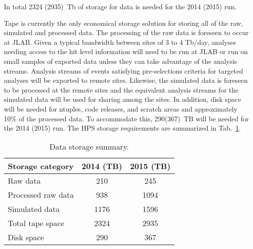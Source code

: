In total 2324 (2935)~Tb of storage for data is needed for the 2014 (2015) run.

Tape is currently the only economical storage
solution for storing all of the raw, simulated and processed data.
The processing of the raw data is foreseen to occur at JLAB. Given a
typical bandwidth between sites of 3 to 4 Tb/day, analyses needing
access to the hit level information will need to be run at JLAB or run
on small samples of exported data unless they can take advantage of the
analysis streams. Analysis streams of events satisfying
pre-selections criteria for targeted analyses will be exported to remote
sites. Likewise, the simulated data is foreseen to be processed at the
remote sites and the equivalent analysis streams for the simulated data
will be used for sharing among the sites. In addition, disk space will be 
needed for ntuples, code releases, and scratch areas and approximately 10\% of the 
processed data. To accommodate this, 290(367)~TB will be needed for the 2014 (2015) run. 
The HPS storage requirements are summarized in Tab.~\ref{tab:datastorage}.
\begin{table}[tbp]
\centering
\begin{tabular}{|l|c|c|}
\hline
Storage category & 2014 (TB) & 2015 (TB) \\
\hline
Raw data & 210 & 245 \\
Processed raw data & 938 & 1094 \\
Simulated data & 1176 & 1596 \\
\hline
Total tape space & 2324 & 2935 \\
\hline
Disk space  & 290  & 367 \\
\hline
\end{tabular}
\caption{{\small Data storage summary.}}
\label{tab:datastorage}
\end{table}



